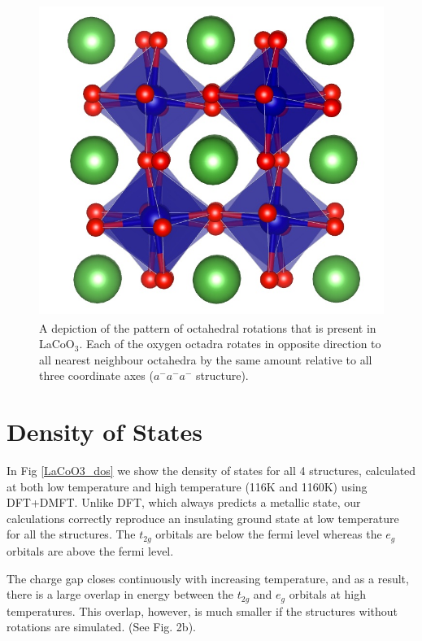 \documentclass[10pt]{ruthesis}
\begin{document}
{\begin{figure}[H]
 \begin{center}
 \includegraphics[height=4in]{plots_final/supplement_plots/a-a-a-_struct}
 \caption{A depiction of the pattern of octahedral rotations that is present in LaCoO$_3$. Each of the oxygen octadra rotates in opposite direction to all nearest neighbour octahedra by the same amount relative to all three coordinate axes ($a^-a^-a^-$ structure).}\label{structure}
 \end{center}
 \end{figure}
 
\section{Density of States}
In Fig \ref{LaCoO3_dos} we show the density of states for all 4 structures, calculated at both low temperature and high temperature (116K and 1160K) using DFT+DMFT. Unlike DFT, which always predicts a metallic state, our calculations correctly reproduce an insulating ground state at low temperature for all the structures. The $t_{2g}$ orbitals are below the fermi level whereas the $e_g$ orbitals are above the fermi level. 





The charge gap closes continuously with increasing temperature, and as a result, there is a large overlap in energy between the $t_{2g}$ and $e_g$ orbitals at high temperatures. This overlap, however, is much smaller if the structures without rotations are simulated. (See Fig. 2b).

}
\end{document}
